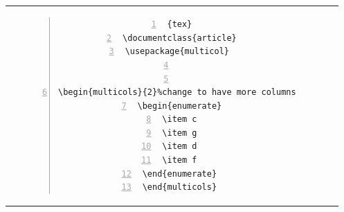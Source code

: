 \subsection{}
\begin{table}[h!]
\begin{tabular}{c | c}
\begin{minipage}[m]{0.4\textwidth}
\enum{
\begin{multicols}{2}%
\begin{enumerate}
\item c
\item g
\item d
\item f
\end{enumerate}
\end{multicols}}{\thesubsection}
\end{minipage}
&
\begin{minipage}[m]{0.55\textwidth}
\renewcommand\textminus{\mbox{-}}%
\begin{lstlisting}[numberstyle=\zebra{blue!15}{orange!15},numbers=left,basicstyle=\ttfamily\scriptsize]{tex}
\documentclass{article}
\usepackage{multicol} 


\begin{multicols}{2}%change to have more columns 
\begin{enumerate}
\item c
\item g
\item d
\item f
\end{enumerate}
\end{multicols}

\end{lstlisting}
\end{minipage}
\end{tabular}
\end{table}

